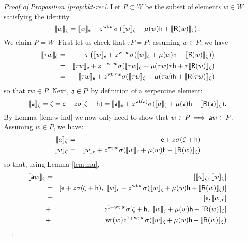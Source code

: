 \begin{proof}[Proof of Proposition \ref{prop:bkt-rec}]
Let $P \subset W$ be the subset of elements $w\in W$ satisfying the identity
\[
\llbracket{w}\rrbracket_\zeta = \llbracket{w}\rrbracket_{\mathsf{e}} + z^{\operatorname{\mathrm{wt}} w} \sigma \left( \llbracket{w}\rrbracket_\zeta + \mu(w) \mathsf{h} + \llbracket{\mathsf{R}(w)}\rrbracket_\zeta \right).
 \]  
We claim $P = W$. First let us check that $\tau P=P$: assuming
$w\in P$, we have 
\begin{eqnarray*}
        \llbracket{\tau w}\rrbracket_\zeta  &=& \tau \left( \llbracket{w}\rrbracket_{\mathsf{e}} + z^{\operatorname{\mathrm{wt}} w} \sigma ( \llbracket{w}\rrbracket_\zeta  + \mu(w) \mathsf{h} + \llbracket{\mathsf{R}(w)}\rrbracket_\zeta  ) \right)
                        \\  &=& \llbracket{\tau w}\rrbracket_{\mathsf{e}} + z^{-\operatorname{\mathrm{wt}} w} \sigma ( \llbracket{\tau w}\rrbracket_\zeta  - \mu(\tau w) \tau \mathsf{h} + \tau \llbracket{\mathsf{R}(w)}\rrbracket_\zeta  )
                        \\  &=& \llbracket{\tau w}\rrbracket_{\mathsf{e}} + z^{\operatorname{\mathrm{wt}} \tau w} \sigma ( \llbracket{\tau w}\rrbracket_\zeta  + \mu(\tau w) \mathsf{h} + \llbracket{\mathsf{R}(\tau w)}\rrbracket_\zeta  )
\end{eqnarray*}
so that $\tau w \in P$.
Next, $\mathsf{a}\in P$ by definition of a serpentine element:
\[
        \llbracket{\mathsf{a}}\rrbracket_\zeta = \zeta = \mathsf{e} + z \sigma (\zeta+\mathsf{h}) = \llbracket{\mathsf{a}}\rrbracket_{\mathsf{e}} + z^{\operatorname{\mathrm{wt}}(\mathsf{a})} \sigma (\llbracket{a}\rrbracket_\zeta + \mu(\mathsf{a}) \mathsf{h} + \llbracket{\mathsf{R}(\mathsf{a})}\rrbracket_\zeta).
\] 
By Lemma \ref{lem:w-ind} we now only need to show that $w \in P \implies \mathsf{a} w\in P$.
Assuming $w \in P$, we have:
\begin{eqnarray*}
        \llbracket{a}\rrbracket_\zeta &=& \mathsf{e} + z \sigma (\zeta + \mathsf{h}) \\
\llbracket{w}\rrbracket_\zeta &=& \llbracket{w}\rrbracket_{\mathsf{e}} + z^{\operatorname{\mathrm{wt}} w} \sigma ( \llbracket{w}\rrbracket_\zeta + \mu(w)\mathsf{h} + \llbracket{\mathsf{R}(w)}\rrbracket_\zeta)
\end{eqnarray*}
so that, using Lemma \ref{lem:mu},
\begin{eqnarray*}
        \bkt{\a w}_\zeta &=& [ \bkt{a}_\zeta, \bkt{w}_\zeta ] 
                      \\ &=& [\e + z\sigma(\zeta+\h),\ \bkt{w}_\e + z^{\wt w}\sigma(\bkt{w}_\zeta+\mu(w)\h+\bkt{\R(w)}_\zeta)]
                      \\ &=& [\e, \bkt{w}_\e] 
                      \\ &+& z^{1+\wt w} \sigma [\zeta+\h,\ \bkt{w}_\zeta + \mu(w)\h + \bkt{\R(w)}_\zeta]
                      \\ &+& \wt(w) z^{1+\wt w}\sigma ( \bkt{w}_\zeta + \mu(w)\h + \bkt{\R(w)}_\zeta)

\end{eqnarray*}
\end{proof}

